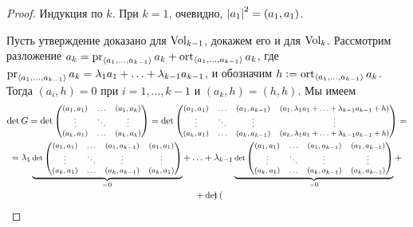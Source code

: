 \begin{proof}
    Индукция по $k$. При $k = 1$, очевидно, $\left\lvert a_1\right\rvert^2 = (a_1, a_1)$.

    Пусть утверждение доказано для $\operatorname{Vol}_{k - 1}$, докажем его и для $\operatorname{Vol}_k$. Рассмотрим разложение $a_k = \operatorname{pr}_{\langle a_1, \ldots, a_{k - 1}\rangle}a_k + \operatorname{ort}_{\langle a_1, \ldots, a_{k - 1}\rangle}a_k$, где $\operatorname{pr}_{\langle a_1, \ldots, a_{k - 1}\rangle}a_k = \lambda_1a_1 + \ldots + \lambda_{k - 1}a_{k - 1}$, и обозначим $h \vcentcolon = \operatorname{ort}_{\langle a_1, \ldots, a_{k - 1}\rangle}a_k$. Тогда $(a_i, h) = 0$ при $i = 1, \ldots, k - 1$ и $(a_k, h) = (h, h)$. Мы имеем
    \begin{multline*}\footnotesize
        \det G = \det
        \begin{pmatrix}
            (a_1, a_1) & \ldots & (a_1, a_k)\\
            \vdots & \ddots & \vdots\\
            (a_k, a_1) & \ldots & (a_k, a_k)
        \end{pmatrix} = \det
        \begin{pmatrix}
            (a_1, a_1) & \ldots & (a_1, a_{k - 1}) & (a_1, \lambda_1a_1 + \ldots + \lambda_{k - 1}a_{k - 1} + h)\\
            \vdots & \ddots & \vdots & \vdots\\
            (a_k, a_1) & \ldots & (a_k, a_{k - 1}) & (a_k, \lambda_1a_1 + \ldots + \lambda_{k - 1}a_{k - 1} + h)
        \end{pmatrix} =\\\footnotesize = \lambda_1\underbrace{\det
        \begin{pmatrix}
            (a_1, a_1) & \ldots & (a_1, a_{k - 1}) & (a_1, a_1)\\
            \vdots & \ddots & \vdots & \vdots\\
            (a_k, a_1) & \ldots & (a_k, a_{k - 1}) & (a_k, a_1)
        \end{pmatrix}}_{= 0} + \ldots + \lambda_{k - 1}\underbrace{\det
        \begin{pmatrix}
            (a_1, a_1) & \ldots & (a_1, a_{k - 1}) & (a_1, a_{k - 1})\\
            \vdots & \ddots & \vdots & \vdots\\
            (a_k, a_1) & \ldots & (a_k, a_{k - 1}) & (a_k, a_{k - 1})
        \end{pmatrix}}_{= 0} +\\\footnotesize + \det
        \begin{pmatrix}

\end{pmatrix}
\end{multline*}
\end{proof}
